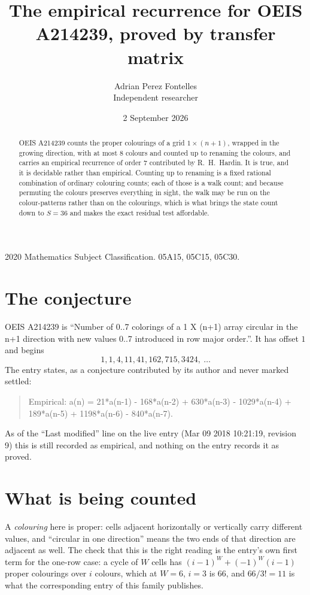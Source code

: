 \documentclass[11pt,a4paper]{article}
\title{The empirical recurrence for OEIS A214239, proved by transfer matrix}
\author{Adrian Perez Fontelles\\ \small Independent researcher}
\date{2 September 2026}
\theoremstyle{plain}
\theoremstyle{definition}
\begin{document}
\maketitle

\begin{abstract}
OEIS A214239 counts the proper colourings of a grid $1\times(n+1)$, wrapped in the growing direction, with at most $8$ colours and
counted up to renaming the colours, and carries an empirical recurrence of order $7$
contributed by R.~H.~Hardin. It is true, and it is decidable rather than empirical. Counting
up to renaming is a fixed rational combination of ordinary colouring counts; each of those is
a walk count; and because permuting the colours preserves everything in sight, the walk may be
run on the colour-patterns rather than on the colourings, which is what brings the state count
down to $S=36$ and makes the exact residual test affordable.
\end{abstract}

\noindent\small 2020 Mathematics Subject Classification. 05A15, 05C15, 05C30.\normalsize

\section{The conjecture}

OEIS A214239 is ``Number of 0..7 colorings of a 1 X (n+1) array circular in the n+1 direction with new values 0..7 introduced in row major order.''. It has offset $1$ and begins
\[
1, 1, 4, 11, 41, 162, 715, 3424,\ \dots
\]
The entry states, as a conjecture contributed by its author and never marked settled:
\begin{quote}
Empirical: a(n) = 21*a(n-1) - 168*a(n-2) + 630*a(n-3) - 1029*a(n-4) + 189*a(n-5) + 1198*a(n-6) - 840*a(n-7).
\end{quote}
As of the ``Last modified'' line on the live entry (Mar 09 2018 10:21:19, revision 9) this is still
recorded as empirical, and nothing on the entry records it as proved.

\section{What is being counted}

A \emph{colouring} here is proper: cells adjacent horizontally or vertically carry different
values, and ``circular in one direction'' means the two ends of that direction are adjacent as
well. The check that this is the right reading is the entry's own first term for the
one-row case: a cycle of $W$ cells has $(i-1)^W+(-1)^W(i-1)$ proper colourings over $i$
colours, which at $W=6$, $i=3$ is $66$, and $66/3!=11$ is what the corresponding entry of this
family publishes.
\end{document}
